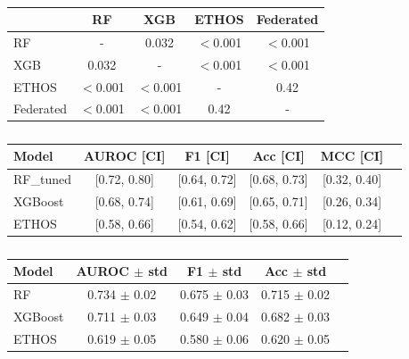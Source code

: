 \begin{table}[h]
\begin{englishblock}
\centering
\caption{}
\begin{tabular}{lcccc}
\toprule
 & RF & XGB & ETHOS & Federated \\
\midrule
RF & - & 0.032 & $<$0.001 & $<$0.001 \\
XGB & 0.032 & - & $<$0.001 & $<$0.001 \\
ETHOS & $<$0.001 & $<$0.001 & - & 0.42 \\
Federated & $<$0.001 & $<$0.001 & 0.42 & - \\
\bottomrule
\end{tabular}
\label{tab:wilcoxon}
\end{englishblock}
\end{table}

\begin{table}[h]
\begin{englishblock}
\centering
\caption{}
\begin{tabular}{lccccc}
\toprule
Model & AUROC [CI] & F1 [CI] & Acc [CI] & MCC [CI] \\
\midrule
RF\_tuned & [0.72, 0.80] & [0.64, 0.72] & [0.68, 0.73] & [0.32, 0.40] \\
XGBoost & [0.68, 0.74] & [0.61, 0.69] & [0.65, 0.71] & [0.26, 0.34] \\
ETHOS & [0.58, 0.66] & [0.54, 0.62] & [0.58, 0.66] & [0.12, 0.24] \\
\bottomrule
\end{tabular}
\label{tab:bootstrap_ci}
\end{englishblock}
\end{table}

\begin{table}[h]
\begin{englishblock}
\centering
\caption{}
\begin{tabular}{lcccc}
\toprule
Model & AUROC $\pm$ std & F1 $\pm$ std & Acc $\pm$ std \\
\midrule
RF & 0.734 $\pm$ 0.02 & 0.675 $\pm$ 0.03 & 0.715 $\pm$ 0.02 \\
XGBoost & 0.711 $\pm$ 0.03 & 0.649 $\pm$ 0.04 & 0.682 $\pm$ 0.03 \\
ETHOS & 0.619 $\pm$ 0.05 & 0.580 $\pm$ 0.06 & 0.620 $\pm$ 0.05 \\
\bottomrule
\end{tabular}
\label{tab:crossval}
\end{englishblock}
\end{table}

